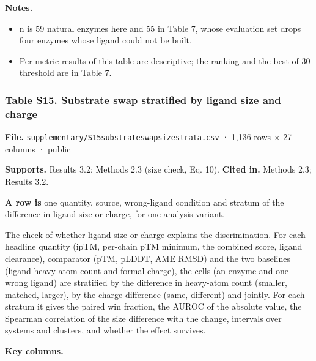 \documentclass[
  10pt,
]{article}
\providecommand{\tightlist}{%
  \setlength{\itemsep}{0pt}\setlength{\parskip}{0pt}}
\DeclareRobustCommand{\_}{\textunderscore\hspace{0pt}}
\begin{document}
\textbf{Notes.}

\begin{itemize}
\tightlist
\item
  n is 59 natural
  enzymes here and
  55 in Table 7,
  whose evaluation
  set drops four
  enzymes whose
  ligand could not
  be built.
\item
  Per-metric results
  of this table are
  descriptive; the
  ranking and the
  best-of-30
  threshold are in
  Table 7.
\end{itemize}

\hypertarget{S15}{%
\subsubsection{Table
S15. Substrate swap
stratified by ligand
size and
charge}\label{S15}}

\begin{shaded}\small

\textbf{File.}
\texttt{supplementary/S15\_substrate\_swap\_size\_strata.csv}
· 1,136 rows × 27
columns · public

\textbf{Supports.}
Results 3.2; Methods
2.3 (size check, Eq.
10). \textbf{Cited
in.} Methods 2.3;
Results 3.2.

\textbf{A row is}
one quantity,
source, wrong-ligand
condition and
stratum of the
difference in ligand
size or charge, for
one analysis
variant.

\end{shaded}

The check of whether
ligand size or
charge explains the
discrimination. For
each headline
quantity (ipTM,
per-chain pTM
minimum, the
combined score,
ligand clearance),
comparator (pTM,
pLDDT, AME RMSD) and
the two baselines
(ligand heavy-atom
count and formal
charge), the cells
(an enzyme and one
wrong ligand) are
stratified by the
difference in
heavy-atom count
(smaller, matched,
larger), by the
charge difference
(same, different)
and jointly. For
each stratum it
gives the paired win
fraction, the AUROC
of the absolute
value, the Spearman
correlation of the
size difference with
the change,
intervals over
systems and
clusters, and
whether the effect
survives.

\textbf{Key
columns.}
\end{document}
